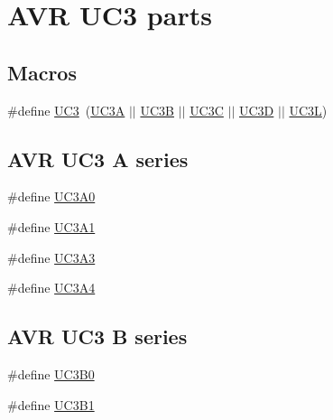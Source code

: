 \hypertarget{group__uc3__part__macros__group}{}\section{A\+VR U\+C3 parts}
\label{group__uc3__part__macros__group}
\subsection*{Macros}
\begin{DoxyCompactItemize}
\item 
\#define \mbox{\hyperlink{group__uc3__part__macros__group_ga848d950beec67bc702bfcfdecc70bb5b}{U\+C3}}~(\mbox{\hyperlink{group__uc3__part__macros__group_gaf7f16cc2bde7daf34576983fee8824c8}{U\+C3A}} $\vert$$\vert$ \mbox{\hyperlink{group__uc3__part__macros__group_ga61e51606324c212eb11079e5acf592e0}{U\+C3B}} $\vert$$\vert$ \mbox{\hyperlink{group__uc3__part__macros__group_gac7a13b9ceb67804d94b6a8967512ee71}{U\+C3C}} $\vert$$\vert$ \mbox{\hyperlink{group__uc3__part__macros__group_ga351a876f40669641e6ba9620909143d3}{U\+C3D}} $\vert$$\vert$ \mbox{\hyperlink{group__uc3__part__macros__group_gac8a7d715e500aa74cd05e0f0fc5bb005}{U\+C3L}})
\end{DoxyCompactItemize}
\subsection*{A\+VR U\+C3 A series}
\begin{DoxyCompactItemize}
\item 
\#define \mbox{\hyperlink{group__uc3__part__macros__group_gaee4dd9ce50cc26707d159660db9fc408}{U\+C3\+A0}}
\item 
\#define \mbox{\hyperlink{group__uc3__part__macros__group_gacbe47eb7ac7d6e655d45657bffab3af6}{U\+C3\+A1}}
\item 
\#define \mbox{\hyperlink{group__uc3__part__macros__group_gae08aa32db9bd4a60a8cfa222f7ff74cc}{U\+C3\+A3}}
\item 
\#define \mbox{\hyperlink{group__uc3__part__macros__group_ga633294c4776386c15ab2050644e77b4f}{U\+C3\+A4}}
\end{DoxyCompactItemize}
\subsection*{A\+VR U\+C3 B series}
\begin{DoxyCompactItemize}
\item 
\#define \mbox{\hyperlink{group__uc3__part__macros__group_ga701194230718f73a89efc39742e061af}{U\+C3\+B0}}
\item 
\#define \mbox{\hyperlink{group__uc3__part__macros__group_ga96602eec1c923afe92a64d807a242cd7}{U\+C3\+B1}}
\end{DoxyCompactItemize}

